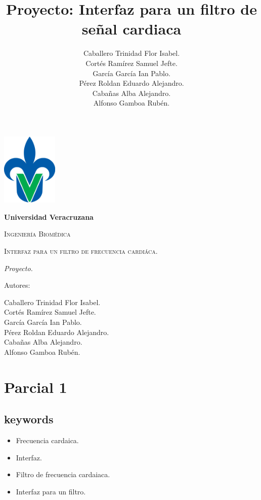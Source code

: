 \documentclass[14pt]{report}
\title{Proyecto: Interfaz para un filtro de señal cardiaca}
\author{Caballero Trinidad Flor Isabel. \\ Cortés Ramírez Samuel Jefte. \\ García García Ian Pablo. \\ Pérez Roldan Eduardo Alejandro. \\ Cabañas Alba Alejandro. \\ Alfonso Gamboa Rubén.}
\begin{document}
\begin{titlepage}
	\centering
	{\includegraphics[width=0.2\textwidth]{recursos/Universidad_Veracruzana}\par}
	\vspace{1cm}
	{\bfseries\LARGE Universidad Veracruzana \par}
	\vspace{1cm}
	{\scshape\Large Ingeniería Biomédica \par}
	\vspace{3cm}
	{\scshape\Huge Interfaz para un filtro de frecuencia cardiáca. \par}
	\vspace{2cm}
	{\itshape\Large Proyecto. \par}
	\vfill
	{\Large Autores: \par}
	{\Large Caballero Trinidad Flor Isabel. \\ Cortés Ramírez Samuel Jefte. \\ García García Ian Pablo. \\ Pérez Roldan Eduardo Alejandro. \\ Cabañas Alba Alejandro. \\ Alfonso Gamboa Rubén. \par}
	\vfill
	
\end{titlepage}

\chapter{Parcial 1}
	\section{keywords}
		\begin{itemize}
			\item Frecuencia cardaica.
			\item Interfaz.
			\item Filtro de frecuencia cardaiaca.
			\item Interfaz para un filtro.
		\end{itemize}
	
\end{document}
